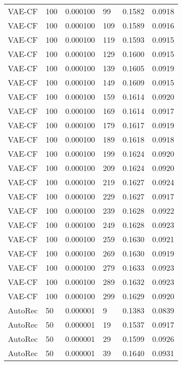 \begin{tabular}{llrlrr}
  VAE-CF &  100 &  0.000100 &    99 &  0.1582 &       0.0918 \\
  VAE-CF &  100 &  0.000100 &   109 &  0.1589 &       0.0916 \\
  VAE-CF &  100 &  0.000100 &   119 &  0.1593 &       0.0915 \\
  VAE-CF &  100 &  0.000100 &   129 &  0.1600 &       0.0915 \\
  VAE-CF &  100 &  0.000100 &   139 &  0.1605 &       0.0919 \\
  VAE-CF &  100 &  0.000100 &   149 &  0.1609 &       0.0915 \\
  VAE-CF &  100 &  0.000100 &   159 &  0.1614 &       0.0920 \\
  VAE-CF &  100 &  0.000100 &   169 &  0.1614 &       0.0917 \\
  VAE-CF &  100 &  0.000100 &   179 &  0.1617 &       0.0919 \\
  VAE-CF &  100 &  0.000100 &   189 &  0.1618 &       0.0918 \\
  VAE-CF &  100 &  0.000100 &   199 &  0.1624 &       0.0920 \\
  VAE-CF &  100 &  0.000100 &   209 &  0.1624 &       0.0920 \\
  VAE-CF &  100 &  0.000100 &   219 &  0.1627 &       0.0924 \\
  VAE-CF &  100 &  0.000100 &   229 &  0.1627 &       0.0917 \\
  VAE-CF &  100 &  0.000100 &   239 &  0.1628 &       0.0922 \\
  VAE-CF &  100 &  0.000100 &   249 &  0.1628 &       0.0923 \\
  VAE-CF &  100 &  0.000100 &   259 &  0.1630 &       0.0921 \\
  VAE-CF &  100 &  0.000100 &   269 &  0.1630 &       0.0919 \\
  VAE-CF &  100 &  0.000100 &   279 &  0.1633 &       0.0923 \\
  VAE-CF &  100 &  0.000100 &   289 &  0.1632 &       0.0923 \\
  VAE-CF &  100 &  0.000100 &   299 &  0.1629 &       0.0920 \\
 AutoRec &   50 &  0.000001 &     9 &  0.1383 &       0.0839 \\
 AutoRec &   50 &  0.000001 &    19 &  0.1537 &       0.0917 \\
 AutoRec &   50 &  0.000001 &    29 &  0.1599 &       0.0926 \\
 AutoRec &   50 &  0.000001 &    39 &  0.1640 &       0.0931 \\

\end{tabular}
